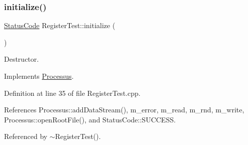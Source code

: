 \subsubsection{\texorpdfstring{initialize()}{initialize()}}
{\footnotesize\ttfamily \hyperlink{classStatusCode}{Status\+Code} Register\+Test\+::initialize (\begin{DoxyParamCaption}{ }\end{DoxyParamCaption})\hspace{0.3cm}{\ttfamily [virtual]}}



Destructor. 



Implements \hyperlink{classProcessus_aee88ad7b77ae7319cf8b128e9dd2ea11}{Processus}.



Definition at line 35 of file Register\+Test.\+cpp.



References Processus\+::add\+Data\+Stream(), m\+\_\+error, m\+\_\+read, m\+\_\+rnd, m\+\_\+write, Processus\+::open\+Root\+File(), and Status\+Code\+::\+S\+U\+C\+C\+E\+SS.



Referenced by $\sim$\+Register\+Test().


